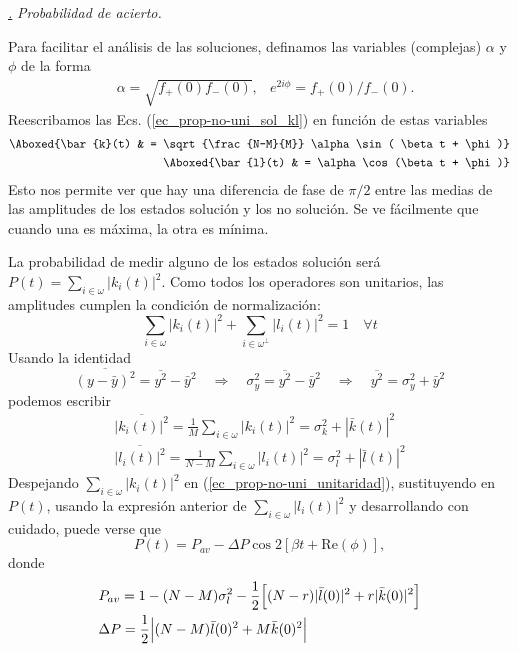 \documentclass[a4paper,11pt]{book} %
\numberwithin{equation}{chapter}
\def\lc{\left[}
\def\rc{\right]}
\def\Lc{\Bigl[}
\def\Rc{\Bigr]}
\def\rqa{\quad \Rightarrow \quad}
\def\subsubiContadorIt{\par\addtocounter{subsubsection}{1}\underline{\it\thesubsubsection.}\hskip0.5cm \setcounter{subsubsubsectionIt}{0}}
\newcommand{\SubsubiIt}[1]{
		\subsubiContadorIt \textit{#1}
	}
\newcounter{subsubsubsectionIt}[subsubsection]
\begin{document}
\SubsubiIt{Probabilidad de acierto.} \label{sec_sec_subsec_prop-no-uni_Pt}

Para facilitar el análisis de las soluciones, definamos las variables (complejas) $\alpha$ y $\phi$ de la forma
\begin{equation}  \label{ec_prop-no-uni_alpha_phi}
\begin{aligned}
& \alpha = \sqrt{f_{+}(0) f_{-}(0)},
& e^{2i\phi} = f_{+}(0)/f_{-}(0).
\end{aligned}
\end{equation}
Reescribamos las Ecs. (\ref{ec_prop-no-uni_sol_kl}) en función de estas variables
\begin{equation} 
\begin{aligned}
\Aboxed{\bar{k}(t) & = \sqrt{\frac{N-M}{M}} \alpha \sin ( \beta t + \phi)}  \\
\Aboxed{\bar{l}(t) & = \alpha \cos (\beta t + \phi)} 
\end{aligned}
\end{equation}
Esto nos permite ver que hay una diferencia de fase de $\pi/2$ entre las medias de las amplitudes de los estados solución y los no solución. Se ve fácilmente que cuando una es máxima, la otra es mínima. 

La probabilidad de medir alguno de los estados solución será $P(t) = \sum_{i \in \omega} |k_i(t)|^2$. Como todos los operadores son unitarios, las amplitudes cumplen la condición de normalización:
\begin{equation} \label{ec_prop-no-uni_unitaridad}
\sum_{i \in \omega} |k_i(t)|^2 + \sum_{i \in \omega^\perp} |l_i(t)|^2 = 1 \quad \forall t
\end{equation}
Usando la identidad
\begin{equation} 
\overline{(y-\bar{y})^2} = \overline{y^2} - \bar{y}^2 \rqa \sigma_y^2 = \overline{y^2} - \bar{y}^2 
\rqa  \overline{y^2} = \sigma_y^2  + \bar{y}^2  
\end{equation}
podemos escribir
\begin{align*}
\overline{|k_i(t)|^2} = \frac{1}{M} \sum_{i \in \omega} |k_i (t) |^2 = \sigma_k^2 + |\bar{k}(t)|^2 \\
\overline{|l_i(t)|^2} = \frac{1}{N-M} \sum_{i \in \omega} |l_i (t) |^2 = \sigma_l^2 + |\bar{l}(t)|^2 
\end{align*}
Despejando $\sum_{i \in \omega} |k_i(t)|^2$ en (\ref{ec_prop-no-uni_unitaridad}), sustituyendo en $P(t)$, usando la expresión anterior de $\sum_{i \in \omega} |l_i (t) |^2 $ y desarrollando con cuidado, puede verse que %
\begin{equation} \label{ec_prop-no-uni_Pt}
\boxed{P(t) = P_{av} - \Delta P \cos 2\lc \beta t + \text{Re}(\phi) \rc ,}
\end{equation}
donde 
\begin{align*}
& P_{av} = 1- (N-M) \sigma_l^2 - \frac{1}{2} \Lc (N-r) |\bar{l}(0)|^2 + r |\bar{k}(0)|^2 \Rc \\
& \Delta P = \frac{1}{2} \Bigl| (N-M) \bar{l}(0)^2 + M \bar{k}(0)^2 \Bigr|
\end{align*}
\end{document}
